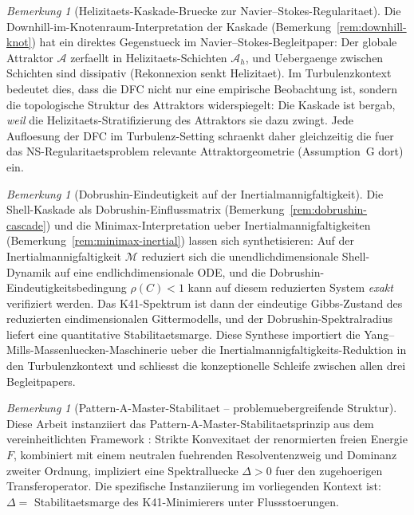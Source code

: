\documentclass[12pt,a4paper]{article}
\theoremstyle{definition}
\theoremstyle{plain}
\theoremstyle{remark}
\newtheorem{remark}[definition]{Bemerkung}
\begin{document}
\begin{remark}[Helizitaets-Kaskade-Bruecke zur Navier--Stokes-Regularitaet]
\label{rem:helicity-cascade-bridge}
Die Downhill-im-Knotenraum-Interpretation der Kaskade
(Bemerkung~\ref{rem:downhill-knot}) hat ein direktes Gegenstueck im
Navier--Stokes-Begleitpaper: Der globale Attraktor $\mathcal{A}$
zerfaellt in Helizitaets-Schichten $\mathcal{A}_h$, und Uebergaenge
zwischen Schichten sind dissipativ (Rekonnexion senkt Helizitaet). Im
Turbulenzkontext bedeutet dies, dass die DFC nicht nur eine empirische
Beobachtung ist, sondern die topologische Struktur des Attraktors
widerspiegelt: Die Kaskade ist bergab, \emph{weil} die
Helizitaets-Stratifizierung des Attraktors sie dazu zwingt. Jede
Aufloesung der DFC im Turbulenz-Setting schraenkt daher gleichzeitig
die fuer das NS-Regularitaetsproblem relevante Attraktorgeometrie
(Assumption~G dort) ein.
\end{remark}

\begin{remark}[Dobrushin-Eindeutigkeit auf der Inertialmannigfaltigkeit]
\label{rem:dobrushin-inertial}
Die Shell-Kaskade als Dobrushin-Einflussmatrix
(Bemerkung~\ref{rem:dobrushin-cascade}) und die Minimax-Interpretation
ueber Inertialmannigfaltigkeiten (Bemerkung~\ref{rem:minimax-inertial})
lassen sich synthetisieren: Auf der Inertialmannigfaltigkeit
$\mathcal{M}$ reduziert sich die unendlichdimensionale Shell-Dynamik
auf eine endlichdimensionale ODE, und die
Dobrushin-Eindeutigkeitsbedingung $\rho(C) < 1$ kann auf diesem
reduzierten System \emph{exakt} verifiziert werden. Das K41-Spektrum
ist dann der eindeutige Gibbs-Zustand des reduzierten
eindimensionalen Gittermodells, und der Dobrushin-Spektralradius
liefert eine quantitative Stabilitaetsmarge. Diese Synthese importiert
die Yang--Mills-Massenluecken-Maschinerie ueber die
Inertialmannigfaltigkeits-Reduktion in den Turbulenzkontext und
schliesst die konzeptionelle Schleife zwischen allen drei
Begleitpapers.
\end{remark}

\begin{remark}[Pattern-A-Master-Stabilitaet -- problemuebergreifende Struktur]
Diese Arbeit instanziiert das Pattern-A-Master-Stabilitaetsprinzip aus dem vereinheitlichten Framework \cite{FST-Unified2026}: Strikte Konvexitaet der renormierten freien Energie $F$, kombiniert mit einem neutralen fuehrenden Resolventenzweig und Dominanz zweiter Ordnung, impliziert eine Spektralluecke $\Delta > 0$ fuer den zugehoerigen Transferoperator. Die spezifische Instanziierung im vorliegenden Kontext ist: $\Delta = $ Stabilitaetsmarge des K41-Minimierers unter Flussstoerungen.
\end{remark}
\end{document}
